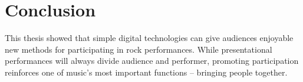 \section{Conclusion}

This thesis showed that simple digital technologies can give audiences enjoyable new methods for participating in rock performances. While presentational performances will always divide audience and performer, promoting participation reinforces one of music's most important functions -- bringing people together.
